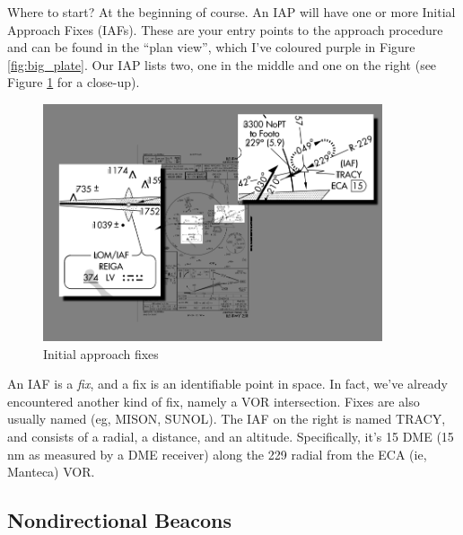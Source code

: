 Where to start?  At the beginning of course.  An IAP will have one or
more Initial Approach Fixes (IAFs).  These are your entry points to
the approach procedure and can be found in the ``plan view'', which
I've coloured purple in Figure \ref{fig:big_plate}.  Our IAP lists
two, one in the middle and one on the right (see Figure \ref{fig:IAFs}
for a close-up).

\begin{figure}
  \begin{center}
    \includegraphics[width=10cm]{img/IAFs}
    \caption{Initial approach fixes}
    \label{fig:IAFs}
  \end{center}
\end{figure}


An IAF is a \emph{fix}, and a fix is an identifiable point in space.
In fact, we've already encountered another kind of fix, namely a VOR
intersection.  Fixes are also usually named (eg, MISON, SUNOL).  The
IAF on the right is named TRACY, and consists of a radial, a distance,
and an altitude.  Specifically, it's 15 DME (15 nm as measured by a
DME receiver) along the 229 radial from the ECA (ie, Manteca) VOR.



\subsection{Nondirectional Beacons}

